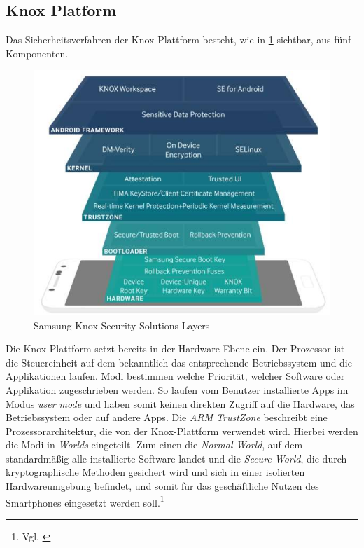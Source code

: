 \subsection{Knox Platform}
Das Sicherheitsverfahren der Knox-Plattform besteht, wie in \cref{fig:SamKno1} sichtbar, aus fünf Komponenten.
\begin{figure}[hbt]
\centering
\includegraphics[width=1\textwidth]{Bilder/sk_1}
\caption{Samsung Knox Security Solutions Layers}\label{fig:SamKno1}
\end{figure}
Die Knox-Plattform setzt bereits in der Hardware-Ebene ein. Der Prozessor ist die Steuereinheit auf dem bekanntlich das entsprechende Betriebssystem und die Applikationen laufen. Modi bestimmen welche Priorität, welcher Software oder Applikation zugeschrieben werden. So laufen vom Benutzer installierte Apps im Modus \textit{user mode} und haben somit keinen direkten Zugriff auf die Hardware, das Betriebssystem oder auf andere Apps. Die \textit{ARM TrustZone} beschreibt eine Prozessorarchitektur, die von der Knox-Plattform verwendet wird. Hierbei werden die Modi in \textit{Worlds} eingeteilt. Zum einen die \textit{Normal World}, auf dem standardmäßig alle installierte Software landet und die \textit{Secure World}, die durch kryptographische Methoden gesichert wird und sich in einer isolierten Hardwareumgebung befindet, und somit für das geschäftliche Nutzen des Smartphones eingesetzt werden soll.\footnote{Vgl. \cite{sam2017c}}

